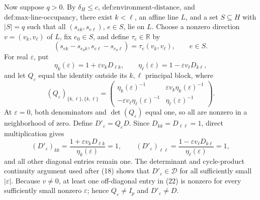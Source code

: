 Now suppose \(q>0\).  By \(\delta_H\le c\), \(\text{def:environment-distance}\), and \(\text{def:max-line-occupancy}\), there exist \(k<\ell\), an affine line \(L\), and a set \(S\subseteq H\) with \(|S|=q\) such that all \((s_{ek},s_{e\ell})\), \(e\in S\), lie on \(L\).  Choose a nonzero direction \(v=(v_k,v_\ell)\) of \(L\), fix \(e_0\in S\), and define \(\tau_e\in\mathbb R\) by
\[
 (s_{ek}-s_{e_0k},s_{e\ell}-s_{e_0\ell})
 =\tau_e(v_k,v_\ell),
 \qquad e\in S.
 \tag{20}
\]
For real \(\varepsilon\), put
\[
 \eta_k(\varepsilon)=1+\varepsilon v_kD_{\ell k},
 \qquad
 \eta_\ell(\varepsilon)=1-\varepsilon v_\ell D_{k\ell},
 \tag{21}
\]
and let \(Q_\varepsilon\) equal the identity outside its \(k,\ell\) principal block, where
\[
 (Q_\varepsilon)_{\{k,\ell\},\{k,\ell\}}
 =\begin{pmatrix}
 \eta_k(\varepsilon)^{-1}&\varepsilon v_k\eta_k(\varepsilon)^{-1}\\
 -\varepsilon v_\ell\eta_\ell(\varepsilon)^{-1}&\eta_\ell(\varepsilon)^{-1}
 \end{pmatrix}.
 \tag{22}
\]
At \(\varepsilon=0\), both denominators and \(\det(Q_\varepsilon)\) equal one, so all are nonzero in a neighborhood of zero.  Define \(D'_{\varepsilon}=Q_\varepsilon D\).  Since \(D_{kk}=D_{\ell\ell}=1\), direct multiplication gives
\[
 (D'_{\varepsilon})_{kk}
 =\frac{1+\varepsilon v_kD_{\ell k}}{\eta_k(\varepsilon)}=1,
 \qquad
 (D'_{\varepsilon})_{\ell\ell}
 =\frac{1-\varepsilon v_\ell D_{k\ell}}{\eta_\ell(\varepsilon)}=1,
 \tag{23}
\]
and all other diagonal entries remain one.  The determinant and cycle-product continuity argument used after (18) shows that \(D'_{\varepsilon}\in\mathcal D\) for all sufficiently small \(|\varepsilon|\).  Because \(v\ne0\), at least one off-diagonal entry in (22) is nonzero for every sufficiently small nonzero \(\varepsilon\); hence \(Q_\varepsilon\ne I_p\) and \(D'_{\varepsilon}\ne D\).

